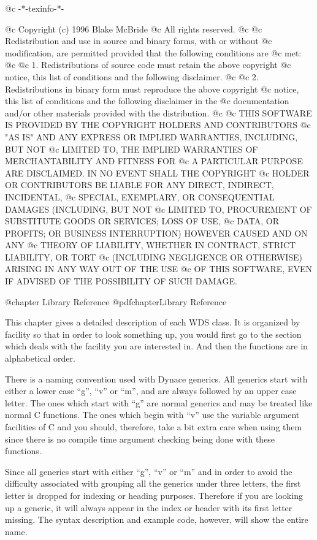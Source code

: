 @c -*-texinfo-*-

@c  Copyright (c) 1996 Blake McBride
@c  All rights reserved.
@c
@c  Redistribution and use in source and binary forms, with or without
@c  modification, are permitted provided that the following conditions are
@c  met:
@c
@c  1. Redistributions of source code must retain the above copyright
@c  notice, this list of conditions and the following disclaimer.
@c
@c  2. Redistributions in binary form must reproduce the above copyright
@c  notice, this list of conditions and the following disclaimer in the
@c  documentation and/or other materials provided with the distribution.
@c
@c  THIS SOFTWARE IS PROVIDED BY THE COPYRIGHT HOLDERS AND CONTRIBUTORS
@c  "AS IS" AND ANY EXPRESS OR IMPLIED WARRANTIES, INCLUDING, BUT NOT
@c  LIMITED TO, THE IMPLIED WARRANTIES OF MERCHANTABILITY AND FITNESS FOR
@c  A PARTICULAR PURPOSE ARE DISCLAIMED. IN NO EVENT SHALL THE COPYRIGHT
@c  HOLDER OR CONTRIBUTORS BE LIABLE FOR ANY DIRECT, INDIRECT, INCIDENTAL,
@c  SPECIAL, EXEMPLARY, OR CONSEQUENTIAL DAMAGES (INCLUDING, BUT NOT
@c  LIMITED TO, PROCUREMENT OF SUBSTITUTE GOODS OR SERVICES; LOSS OF USE,
@c  DATA, OR PROFITS; OR BUSINESS INTERRUPTION) HOWEVER CAUSED AND ON ANY
@c  THEORY OF LIABILITY, WHETHER IN CONTRACT, STRICT LIABILITY, OR TORT
@c  (INCLUDING NEGLIGENCE OR OTHERWISE) ARISING IN ANY WAY OUT OF THE USE
@c  OF THIS SOFTWARE, EVEN IF ADVISED OF THE POSSIBILITY OF SUCH DAMAGE.

@chapter Library Reference
@pdfchapter{Library Reference}

This chapter gives a detailed description of each WDS class.  It is
organized by facility so that in order to look something up, you would
first go to the section which deals with the facility you are interested
in.  And then the functions are in alphabetical order.

There is a naming convention used with Dynace generics.  All generics
start with either a lower case ``g'', ``v'' or ``m'', and are always
followed by an upper case letter.  The ones which start with ``g'' are
normal generics and may be treated like normal C functions.  The ones
which begin with ``v'' use the variable argument facilities of C and
you should, therefore, take a bit extra care when using them since
there is no compile time argument checking being done with these functions.

Since all generics start with either ``g'', ``v'' or ``m'' and in order to
avoid the difficulty associated with grouping all the generics under
three letters, the first letter is dropped for indexing or heading
purposes.  Therefore if you are looking up a generic, it will always
appear in the index or header with its first letter missing.  The syntax
description and example code, however, will show the entire name.


